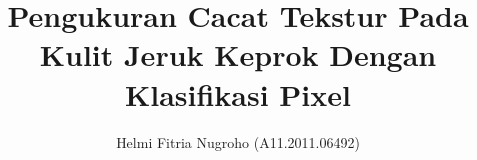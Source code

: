 \documentclass[a4paper, 12pt, oneside]{memoir}
\author{Helmi Fitria Nugroho (A11.2011.06492)}
\title{Pengukuran Cacat Tekstur Pada Kulit Jeruk Keprok Dengan Klasifikasi Pixel}
\begin{document}
\bahasahyphenmins
\datebahasa
\captionsbahasa




\begin{Spacing}{1.5}
%













\end{Spacing}

\begin{Spacing}{1}



\clearpage



\end{Spacing}

\clearpage














\end{document}
